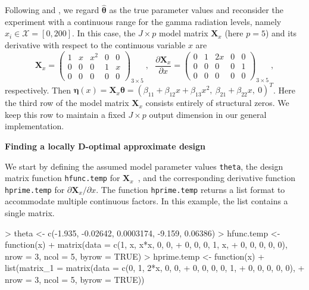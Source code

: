 Following \cite{ai2023locally} and \cite{huang2024forlion}, we regard $\hat{\boldsymbol{\theta}}$ as the true parameter values and reconsider the experiment with a continuous range for the gamma radiation levels, namely $x_i \in \mathcal{X} = [0, 200]$. In this case, the $J \times p$ model matrix $\mathbf{X}_x$ (here $p=5$) and its derivative with respect to the continuous variable $x$ are 
\[
\mathbf{X}_x
=
\left(
\begin{array}{ccccc}
1 & x & x^2 & 0 & 0 \\
0 & 0 & 0   & 1 & x \\
0 & 0 & 0   & 0 & 0
\end{array}
\right)_{3\times 5}\ ,\>\>\>
\frac{\partial \mathbf{X}_x}{\partial x}
=
\left(
\begin{array}{ccccc}
0 & 1 & 2x & 0 & 0 \\
0 & 0 & 0  & 0 & 1 \\
0 & 0 & 0  & 0 & 0
\end{array}
\right)_{3\times 5}\ ,
\]
respectively. Then $\boldsymbol{\eta}(x) = \mathbf{X}_x \boldsymbol{\theta}=\left(\beta_{11}+\beta_{12} x+\beta_{13} x^2,\ \beta_{21}+\beta_{22} x,\ 0\right)^T$. Here the third row of the model matrix $\mathbf{X}_x$ consists entirely of structural zeros.  We keep this row to maintain a fixed $J \times p$ output dimension in our general implementation.

\medskip
\noindent
{\bf Finding a locally D-optimal approximate design}
\smallskip

\noindent
We start by defining the assumed model parameter values \texttt{theta}, the design matrix function  \texttt{hfunc.temp} for $\mathbf{X}_x$~, and the corresponding derivative function \texttt{hprime.temp} for $\partial \mathbf{X}_x/\partial x$. The function \texttt{hprime.temp} returns a list format to accommodate multiple continuous factors. In this example, the list contains a single matrix.
\begin{example}
> theta <- c(-1.935, -0.02642, 0.0003174, -9.159, 0.06386)
> hfunc.temp <- function(x){
+               matrix(data = c(1, x, x*x, 0, 0,
+                               0, 0, 0, 1, x,
+                               0, 0, 0, 0, 0), nrow = 3, ncol = 5, byrow = TRUE)} 
> hprime.temp <- function(x){
+                list(matrix_1 = matrix(data = c(0, 1, 2*x, 0, 0,
+                                                0, 0, 0, 0, 1,
+                                                0, 0, 0, 0, 0), 
+                                                nrow = 3, ncol = 5, byrow = TRUE))}
\end{example}

